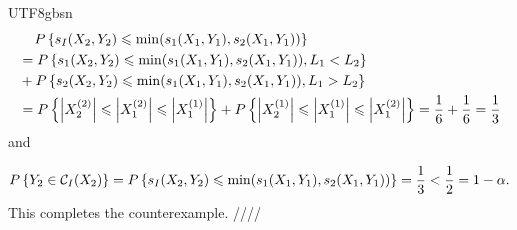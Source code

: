 \documentclass[../main.tex]{subfiles}
\begin{document}
\begin{CJK*}{UTF8}{gbsn}
\begin{equation*}
    \begin{split}
    & \tab[0.4cm] P \curly{s_I(X_2,Y_2) \leqslant \min(s_1(X_1,Y_1),s_2(X_1,Y_1))}
    \\ & = P \curly{s_1(X_2,Y_2) \leqslant \min(s_1(X_1,Y_1),s_2(X_1,Y_1)), L_1 < L_2}
    \\ & + P \curly{s_2(X_2,Y_2) \leqslant \min(s_1(X_1,Y_1),s_2(X_1,Y_1)), L_1 > L_2}
    \\ & = P \curly{\abs{X_2^{(2)}} \leqslant \abs{X_1^{(2)}} \leqslant \abs{X_1^{(1)}}}
    + P \curly{\abs{X_2^{(1)}} \leqslant \abs{X_1^{(1)}} \leqslant \abs{X_1^{(2)}}}
    = \frac{1}{6} + \frac{1}{6} = \frac{1}{3}
    \end{split}
\end{equation*}
and

\begin{equation*}
    P \curly{Y_2 \in \mathcal{C}_I(X_2)} 
    = P \curly{s_I(X_2,Y_2) \leqslant \min(s_1(X_1,Y_1),s_2(X_1,Y_1))}
    = \frac{1}{3} < \frac{1}{2} = 1-\alpha.
\end{equation*}
This completes the counterexample.
////
\end{CJK*}
\end{document}
